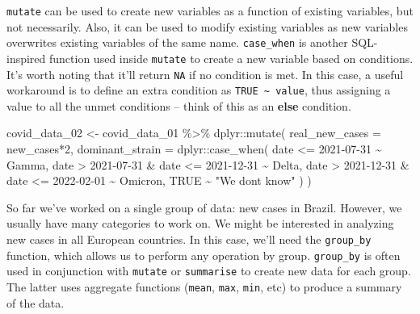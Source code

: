 \documentclass[
]{book}
\newenvironment{Shaded}{\begin{snugshade}}{\end{snugshade}}
\newcommand{\AttributeTok}[1]{\textcolor[rgb]{0.77,0.63,0.00}{#1}}
\newcommand{\ConstantTok}[1]{\textcolor[rgb]{0.00,0.00,0.00}{#1}}
\newcommand{\DecValTok}[1]{\textcolor[rgb]{0.00,0.00,0.81}{#1}}
\newcommand{\FunctionTok}[1]{\textcolor[rgb]{0.00,0.00,0.00}{#1}}
\newcommand{\NormalTok}[1]{#1}
\newcommand{\OtherTok}[1]{\textcolor[rgb]{0.56,0.35,0.01}{#1}}
\newcommand{\SpecialCharTok}[1]{\textcolor[rgb]{0.00,0.00,0.00}{#1}}
\newcommand{\StringTok}[1]{\textcolor[rgb]{0.31,0.60,0.02}{#1}}
\begin{document}
\texttt{mutate} can be used to create new variables as a function of existing variables, but not necessarily. Also, it can be used to modify existing variables as new variables overwrites existing variables of the same name. \texttt{case\_when} is another SQL-inspired function used inside \texttt{mutate} to create a new variable based on conditions. It's worth noting that it'll return \texttt{NA} if no condition is met. In this case, a useful workaround is to define an extra condition as \texttt{TRUE\ \textasciitilde{}\ value}, thus assigning a value to all the unmet conditions -- think of this as an \textbf{else} condition.

\begin{Shaded}
\begin{Highlighting}[]
\NormalTok{covid\_data\_02 }\OtherTok{\textless{}{-}}\NormalTok{ covid\_data\_01 }\SpecialCharTok{\%\textgreater{}\%} 
\NormalTok{  dplyr}\SpecialCharTok{::}\FunctionTok{mutate}\NormalTok{(}
    \AttributeTok{real\_new\_cases =}\NormalTok{ new\_cases}\SpecialCharTok{*}\DecValTok{2}\NormalTok{,}
    \AttributeTok{dominant\_strain  =}\NormalTok{ dplyr}\SpecialCharTok{::}\FunctionTok{case\_when}\NormalTok{(}
\NormalTok{      date }\SpecialCharTok{\textless{}=} \StringTok{\textquotesingle{}2021{-}07{-}31\textquotesingle{}}                        \SpecialCharTok{\textasciitilde{}} \StringTok{\textquotesingle{}Gamma\textquotesingle{}}\NormalTok{,}
\NormalTok{      date }\SpecialCharTok{\textgreater{}}  \StringTok{\textquotesingle{}2021{-}07{-}31\textquotesingle{}} \SpecialCharTok{\&}\NormalTok{ date }\SpecialCharTok{\textless{}=} \StringTok{\textquotesingle{}2021{-}12{-}31\textquotesingle{}} \SpecialCharTok{\textasciitilde{}} \StringTok{\textquotesingle{}Delta\textquotesingle{}}\NormalTok{,}
\NormalTok{      date }\SpecialCharTok{\textgreater{}}  \StringTok{\textquotesingle{}2021{-}12{-}31\textquotesingle{}} \SpecialCharTok{\&}\NormalTok{ date }\SpecialCharTok{\textless{}=} \StringTok{\textquotesingle{}2022{-}02{-}01\textquotesingle{}} \SpecialCharTok{\textasciitilde{}} \StringTok{\textquotesingle{}Omicron\textquotesingle{}}\NormalTok{,}
      \ConstantTok{TRUE}                                        \SpecialCharTok{\textasciitilde{}} \StringTok{"We don\textquotesingle{}t know"}
\NormalTok{    )}
\NormalTok{  )}
\end{Highlighting}
\end{Shaded}

So far we've worked on a single group of data: new cases in Brazil. However, we usually have many categories to work on. We might be interested in analyzing new cases in all European countries. In this case, we'll need the \texttt{group\_by} function, which allows us to perform any operation by group. \texttt{group\_by} is often used in conjunction with \texttt{mutate} or \texttt{summarise} to create new data for each group. The latter uses aggregate functions (\texttt{mean}, \texttt{max}, \texttt{min}, etc) to produce a summary of the data.
\end{document}

